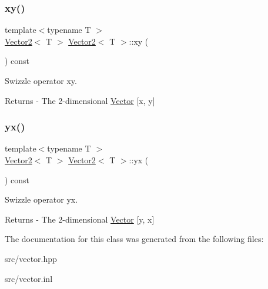 \subsubsection{\texorpdfstring{xy()}{xy()}}
{\footnotesize\ttfamily template$<$typename T $>$ \\
\mbox{\hyperlink{class_vector2}{Vector2}}$<$ T $>$ \mbox{\hyperlink{class_vector2}{Vector2}}$<$ T $>$\+::xy (\begin{DoxyParamCaption}{ }\end{DoxyParamCaption}) const}

Swizzle operator xy. \begin{DoxyReturn}{Returns}
-\/ The 2-\/dimensional \mbox{\hyperlink{class_vector}{Vector}} \mbox{[}x, y\mbox{]} 
\end{DoxyReturn}
\mbox{\label{class_vector2_a45bce734de6f2bc8fc9f0ca6a8bad7a1}} 
\subsubsection{\texorpdfstring{yx()}{yx()}}
{\footnotesize\ttfamily template$<$typename T $>$ \\
\mbox{\hyperlink{class_vector2}{Vector2}}$<$ T $>$ \mbox{\hyperlink{class_vector2}{Vector2}}$<$ T $>$\+::yx (\begin{DoxyParamCaption}{ }\end{DoxyParamCaption}) const}

Swizzle operator yx. \begin{DoxyReturn}{Returns}
-\/ The 2-\/dimensional \mbox{\hyperlink{class_vector}{Vector}} \mbox{[}y, x\mbox{]} 
\end{DoxyReturn}


The documentation for this class was generated from the following files\+:\begin{DoxyCompactItemize}
\item 
src/vector.\+hpp\item 
src/vector.\+inl\end{DoxyCompactItemize}
